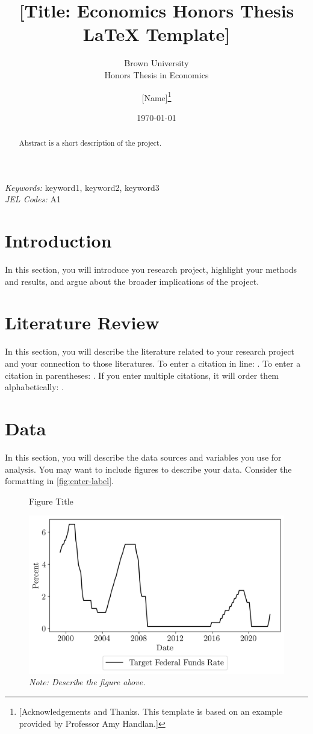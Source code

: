 \documentclass[12pt]{article}
\title{[Title: Economics Honors Thesis LaTeX Template]}
\subtitle{Brown University\\Honors Thesis in Economics}
\author{[Name]\thanks{[Acknowledgements and Thanks. This template is based on an example provided by Professor Amy Handlan.]}}
\date{\today}
\begin{document}
\maketitle

\begin{abstract}
    Abstract is a short description of the project.
\end{abstract} 
\doublespacing
\textit{Keywords:} keyword1, keyword2, keyword3
\\
\textit{JEL Codes:} A1 %
\newpage
{} 
 

\section{Introduction}
In this section, you will introduce you research project, highlight your methods and results, and argue about the broader implications of the project.

\section{Literature Review}
In this section, you will describe the literature related to your research project and your connection to those literatures. To enter a citation in line: \cite{CitationExample}. To enter a citation in parentheses: \citep{CitationExample}. If you enter multiple citations, it will order them alphabetically: \citep{CitationExample,WorkingPaperExample}.

\section{Data}
In this section, you will describe the data sources and variables you use for analysis. You may want to include figures to describe your data. Consider the formatting in \autoref{fig:enter-label}.

\begin{figure}[ht]
    \centering
    \caption{Figure Title}
    \label{fig:enter-label}
    \includegraphics[width=.75\textwidth]{figures/ExampleGraph_TFFR.png}
    \caption*{\footnotesize \textit{Note: Describe the figure above.}}
\end{figure}
\end{document}
